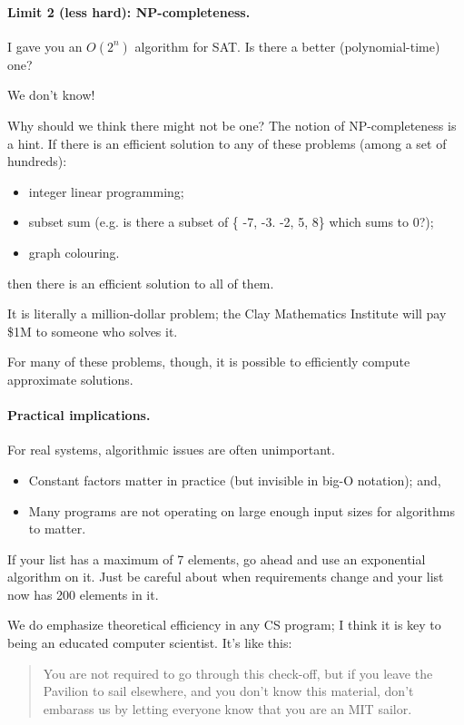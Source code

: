 \documentclass[11pt]{article}
\begin{document}
\paragraph{Limit 2 (less hard): NP-completeness.}
I gave you an $O(2^n)$ algorithm for SAT. Is there a better (polynomial-time) one?

\begin{center}
We don't know!
\end{center}

Why should we think there might not be one? The notion of NP-completeness is a hint.
If there is an efficient solution to any of these problems (among a set of hundreds):
\begin{itemize}
\item integer linear programming;
\item subset sum (e.g. is there a subset of \{ -7, -3. -2, 5, 8\} which sums to 0?);
\item graph colouring.
\end{itemize}
then there is an efficient solution to all of them.

It is literally a million-dollar problem; the Clay Mathematics Institute will pay \$1M
to someone who solves it. 

For many of these problems, though, it is possible to efficiently compute approximate solutions.

\paragraph{Practical implications.} For real systems, algorithmic issues are often 
unimportant.

\begin{itemize}
\item Constant factors matter in practice (but invisible in big-O notation); and,
\item Many programs are not operating on large enough input sizes for algorithms to matter.
\end{itemize}

If your list has a maximum of 7 elements, go ahead and use an exponential algorithm on it.
Just be careful about when requirements change and your list now has 200 elements in it.

We do emphasize theoretical efficiency in any CS program; I think it is key to being an educated computer
scientist. It's like this:

\begin{quote}
You are not required to go through this check-off, but if you leave the Pavilion to sail
elsewhere, and you don't know this material, don't embarass us by letting everyone know
that you are an MIT sailor.
\end{quote}
\end{document}
